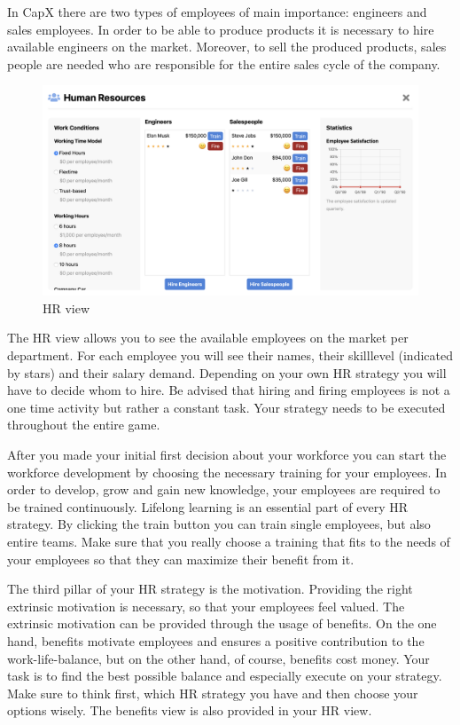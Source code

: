 In CapX there are two types of employees of main importance: engineers and sales employees. In order to be able to produce products it is necessary to hire available engineers on the market. Moreover, to sell the produced products, sales people are needed who are responsible for the entire sales cycle of the company.

\begin{figure} [!htbp]
    \centering
    \includegraphics [width=\textwidth]{HR/hr_view.png}
    \caption{HR view}
    \label{fig:navigationBar}
\end{figure}

The HR view allows you to see the available employees on the market per department. For each employee you will see their names, their skilllevel (indicated by stars) and their salary demand. Depending on your own HR strategy you will have to decide whom to hire. Be advised that hiring and firing employees is not a one time activity but rather a constant task. Your strategy needs to be executed throughout the entire game.

After you made your initial first decision about your workforce you can start the workforce development by choosing the necessary training for your employees. In order to develop, grow and gain new knowledge, your employees are required to be trained continuously. Lifelong learning is an essential part of every HR strategy. By clicking the train button you can train single employees, but also entire teams. Make sure that you really choose a training that fits to the needs of your employees so that they can maximize their benefit from it.

The third pillar of your HR strategy is the motivation. Providing the right extrinsic motivation is necessary, so that your employees feel valued. The extrinsic motivation can be provided through the usage of benefits. On the one hand, benefits motivate employees and ensures a positive contribution to the work-life-balance, but on the other hand, of course, benefits cost money. Your task is to find the best possible balance and especially execute on your strategy. Make sure to think first, which HR strategy you have and then choose your options wisely. The benefits view is also provided in your HR view.